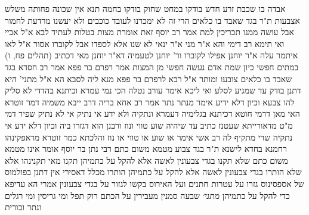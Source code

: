 \documentclass[12pt, openany]{book}
\begin{document}
{אבדה בו שכבת זרע חדש בודקו במחט שחוק בודקו בחמה  תנא  אין שכונה פחותה משלש אצבעות 
ת"ר  בגד שאבד בו כלאים הרי זה לא ימכרנו לעובד כוכבים ולא יעשנו מרדעת לחמור  אבל עושה ממנו תכריכין למת  אמר רב יוסף  זאת אומרת מצות בטלות לעתיד לבא 
א"ל אביי ואי תימא רב דימי  והא א"ר מני א"ר ינאי לא שנו אלא לספדו אבל לקוברו אסור  א"ל  לאו איתמר עלה א"ר יוחנן אפילו לקוברו 
ור' יוחנן לטעמיה דא"ר יוחנן  מאי דכתיב (תהלים פח, ו) במתים חפשי כיון שמת אדם נעשה חפשי מן המצות 
אמר רפרם בר פפא אמר רב חסדא  בגד שאבד בו כלאים צובעו ומותר  א"ל רבא לרפרם בר פפא  מנא ליה לסבא הא 
א"ל  מתני' היא דתנן בודק עד שמגיע לסלע ואי ליכא אימר עורב נטלה  הכי נמי  עמרא וכיתנא בהדדי לא סליק להו צבעא וכיון דלא ידיע אימר מנתר נתר 
אמר רב אחא בריה דרב ייבא משמיה דמר זוטרא  האי מאן דרמי חוטא דכיתנא בגלימיה דעמרא ונתקיה ולא ידע אי נתיק אי לא נתיק שפיר דמי 
מ"ט מדאורייתא שעטנז כתיב עד שיהיה שוע טווי ונוז ורבנן הוא דגזרו ביה  וכיון דלא ידע אי נתקיה שרי 
מתקיף לה רב אשי  אימר או שוע או טווי או נוז  והלכתא כמר זוטרא מדאפקינהו רחמנא בחדא לישנא 
ת"ר  בגד צבוע מטמא משום כתם רבי נתן בר יוסף אומר  אינו מטמא משום כתם שלא תקנו בגדי צבעונין לאשה אלא להקל על כתמיהן 
תקנו  מאי תקנינהו  אלא שלא הותרו בגדי צבעונין לאשה אלא להקל על כתמיהן  הותרו מכלל דאסירי 
אין דתנן  בפולמוס של אספסינוס גזרו על עטרות חתנים ועל האירוס  בקשו לגזור על בגדי צבעונין אמרי  הא עדיפא כדי להקל על כתמיהן
{\large\emph{מתני׳}} שבעה סמנין מעבירין על הכתם רוק תפל ומי גריסין ומי רגלים ונתר ובורית}
\end{document}
